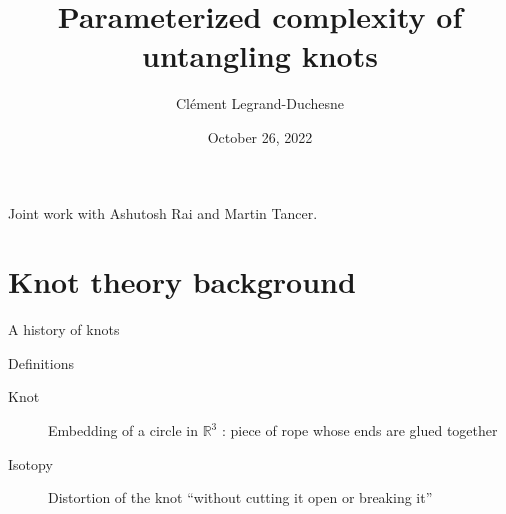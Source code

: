 \documentclass[11pt,xcolor=dvipsnames,presentation,aspectratio=169]{beamer}
\begin{document}
\title{Parameterized complexity of untangling knots}
\author[Clément Legrand]{Clément Legrand-Duchesne}
\date{October 26, 2022}

\begin{frame}
  \titlepage
  \begin{center}
  Joint work with Ashutosh Rai and Martin Tancer.
  \end{center}

\end{frame}

\section*{Knot theory background}

\begin{frame}{A history of knots}
  \begin{block}{Definitions}
    \begin{description}
    \item[Knot] Embedding of a circle in $\mathbb{R}^3$ : piece of rope whose ends are
      glued together 
    \item[Isotopy] Distortion of the knot ``without cutting it open or breaking
      it''
    \end{description}
  \end{block}
\end{frame}
\end{document}
